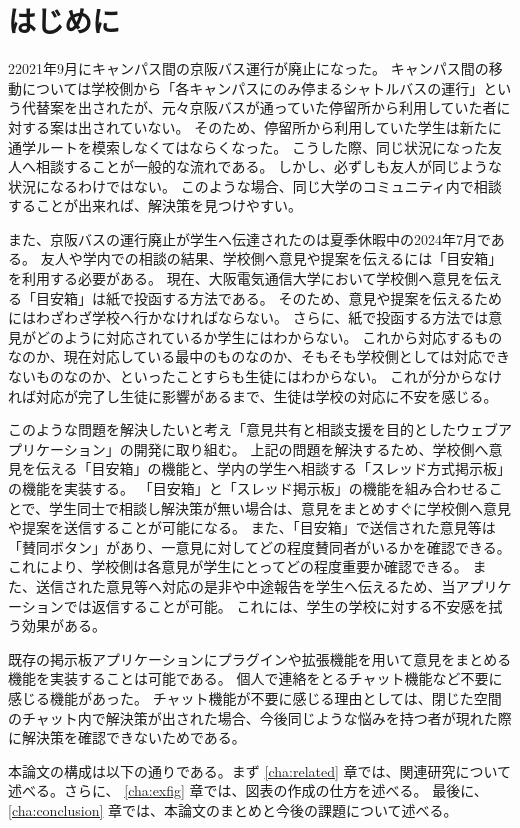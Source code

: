 \documentclass[main]{subfiles}
\begin{document}
\chapter{はじめに}
\label{cha:intro}

22021年9月にキャンパス間の京阪バス運行が廃止になった。
キャンパス間の移動については学校側から「各キャンパスにのみ停まるシャトルバスの運行」という代替案を出されたが、元々京阪バスが通っていた停留所から利用していた者に対する案は出されていない。
そのため、停留所から利用していた学生は新たに通学ルートを模索しなくてはならくなった。
こうした際、同じ状況になった友人へ相談することが一般的な流れである。
しかし、必ずしも友人が同じような状況になるわけではない。
このような場合、同じ大学のコミュニティ内で相談することが出来れば、解決策を見つけやすい。


また、京阪バスの運行廃止が学生へ伝達されたのは夏季休暇中の2024年7月である。
友人や学内での相談の結果、学校側へ意見や提案を伝えるには「目安箱」を利用する必要がある。
現在、大阪電気通信大学において学校側へ意見を伝える「目安箱」は紙で投函する方法である。
そのため、意見や提案を伝えるためにはわざわざ学校へ行かなければならない。
さらに、紙で投函する方法では意見がどのように対応されているか学生にはわからない。
これから対応するものなのか、現在対応している最中のものなのか、そもそも学校側としては対応できないものなのか、といったことすらも生徒にはわからない。
これが分からなければ対応が完了し生徒に影響があるまで、生徒は学校の対応に不安を感じる。


このような問題を解決したいと考え「意見共有と相談支援を目的としたウェブアプリケーション」の開発に取り組む。
上記の問題を解決するため、学校側へ意見を伝える「目安箱」の機能と、学内の学生へ相談する「スレッド方式掲示板」の機能を実装する。
「目安箱」と「スレッド掲示板」の機能を組み合わせることで、学生同士で相談し解決策が無い場合は、意見をまとめすぐに学校側へ意見や提案を送信することが可能になる。
また、「目安箱」で送信された意見等は「賛同ボタン」があり、一意見に対してどの程度賛同者がいるかを確認できる。
これにより、学校側は各意見が学生にとってどの程度重要か確認できる。
また、送信された意見等へ対応の是非や中途報告を学生へ伝えるため、当アプリケーションでは返信することが可能。
これには、学生の学校に対する不安感を拭う効果がある。

既存の掲示板アプリケーションにプラグインや拡張機能を用いて意見をまとめる機能を実装することは可能である。
個人で連絡をとるチャット機能など不要に感じる機能があった。
チャット機能が不要に感じる理由としては、閉じた空間のチャット内で解決策が出された場合、今後同じような悩みを持つ者が現れた際に解決策を確認できないためである。

本論文の構成は以下の通りである。まず \ref{cha:related} 章では、関連研究について述べる。さらに、
\ref{cha:exfig} 章では、図表の作成の仕方を述べる。
最後に、\ref{cha:conclusion} 章では、本論文のまとめと今後の課題について述べる。
\end{document}
